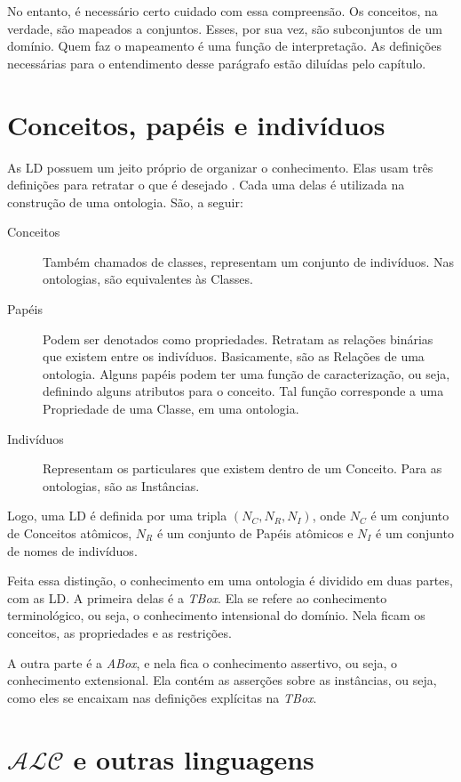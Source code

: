 No entanto, é necessário certo cuidado com essa compreensão. Os conceitos, na verdade, são mapeados a conjuntos. Esses, por sua vez, são subconjuntos de um domínio. Quem faz o mapeamento é uma função de interpretação. As definições necessárias para o entendimento desse parágrafo estão diluídas pelo capítulo.

\section{Conceitos, papéis e indivíduos}

As LD possuem um jeito próprio de organizar o conhecimento. Elas usam três definições para retratar o que é desejado \cite{logicaMatos}. Cada uma delas é utilizada na construção de uma ontologia. São, a seguir:

\begin{description}
	\item[Conceitos] Também chamados de classes, representam um conjunto de indivíduos. Nas ontologias, são equivalentes às Classes.
	\item[Papéis] Podem ser denotados como propriedades. Retratam as relações binárias que existem entre os indivíduos. Basicamente, são as Relações de uma ontologia. Alguns papéis podem ter uma função de caracterização, ou seja, definindo alguns atributos para o conceito. Tal função corresponde a uma Propriedade de uma Classe, em uma ontologia.
	\item[Indivíduos] Representam os particulares que existem dentro de um Conceito. Para as ontologias, são as Instâncias.
\end{description}

Logo, uma LD é definida por uma tripla $ (N_C, N_R, N_I) $, onde $ N_C $ é um conjunto de Conceitos atômicos, $ N_R $ é um conjunto de Papéis atômicos e $ N_I $ é um conjunto de nomes de indivíduos.

Feita essa distinção, o conhecimento em uma ontologia é dividido em duas partes, com as LD. A primeira delas é a \textit{TBox}. Ela se refere ao conhecimento terminológico, ou seja, o conhecimento intensional do domínio. Nela ficam os conceitos, as propriedades e as restrições.

A outra parte é a \textit{ABox}, e nela fica o conhecimento assertivo, ou seja, o conhecimento extensional. Ela contém as asserções sobre as instâncias, ou seja, como eles se encaixam nas definições explícitas na \textit{TBox}.

\section{$\mathcal{ALC}$ e outras linguagens}

